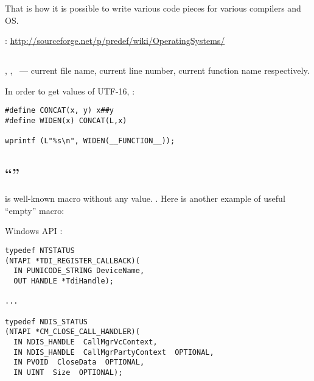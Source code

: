 {That is how it is possible to write various code pieces for various compilers and} \ac{OS}.

:
\url{http://sourceforge.net/p/predef/wiki/OperatingSystems/}

\subsection{}

, ,  ~--- 
{current file name, current line number, current function name respectively}.

{In order to get values of}  \AndENRU {} \InENRU UTF-16, 
:

\begin{lstlisting}
#define CONCAT(x, y) x##y
#define WIDEN(x) CONCAT(L,x)

wprintf (L"%s\n", WIDEN(__FUNCTION__));
\end{lstlisting}

\subsection{``'' }

{ is well-known macro without any value}.
.
{Here is another example of useful ``empty'' macro}:

 Windows API :

\begin{lstlisting}
typedef NTSTATUS
(NTAPI *TDI_REGISTER_CALLBACK)(
  IN PUNICODE_STRING DeviceName,
  OUT HANDLE *TdiHandle);

...

typedef NDIS_STATUS
(NTAPI *CM_CLOSE_CALL_HANDLER)(
  IN NDIS_HANDLE  CallMgrVcContext,
  IN NDIS_HANDLE  CallMgrPartyContext  OPTIONAL,
  IN PVOID  CloseData  OPTIONAL,
  IN UINT  Size  OPTIONAL);
\end{lstlisting}

